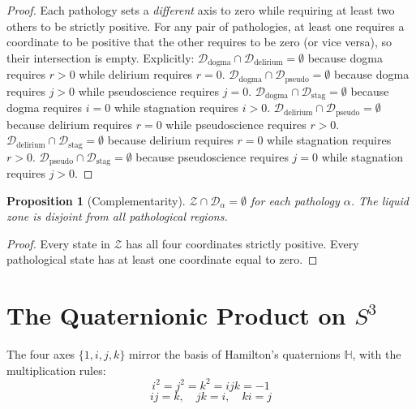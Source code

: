 \documentclass[11pt,a4paper]{article}
\newtheorem{proposition}[theorem]{Proposition}
\newcommand{\imag}[1]{{\color{icolor}#1}}
\newcommand{\exac}[1]{{\color{jcolor}#1}}
\newcommand{\recu}[1]{{\color{kcolor}#1}}
\newcommand{\LZ}{\mathcal{Z}}
\def\imag#1{#1}%
\def\exac#1{#1}%
\def\recu#1{#1}%
\begin{document}
\begin{proof}
Each pathology sets a \emph{different} axis to zero while requiring at
least two others to be strictly positive. For any pair of pathologies,
at least one requires a coordinate to be positive that the other
requires to be zero (or vice versa), so their intersection is empty.
Explicitly:
$\mathcal{D}_{\text{dogma}} \cap \mathcal{D}_{\text{delirium}} =
\emptyset$ because dogma requires $r > 0$ while delirium requires
$r = 0$.
$\mathcal{D}_{\text{dogma}} \cap \mathcal{D}_{\text{pseudo}} =
\emptyset$ because dogma requires $j > 0$ while pseudoscience requires
$j = 0$.
$\mathcal{D}_{\text{dogma}} \cap \mathcal{D}_{\text{stag}} =
\emptyset$ because dogma requires $i = 0$ while stagnation requires
$i > 0$.
$\mathcal{D}_{\text{delirium}} \cap \mathcal{D}_{\text{pseudo}} =
\emptyset$ because delirium requires $r = 0$ while pseudoscience
requires $r > 0$.
$\mathcal{D}_{\text{delirium}} \cap \mathcal{D}_{\text{stag}} =
\emptyset$ because delirium requires $r = 0$ while stagnation requires
$r > 0$.
$\mathcal{D}_{\text{pseudo}} \cap \mathcal{D}_{\text{stag}} =
\emptyset$ because pseudoscience requires $j = 0$ while stagnation
requires $j > 0$.
\end{proof}

\begin{proposition}[Complementarity]
\label{prop:complement}
$\LZ \cap \mathcal{D}_{\alpha} = \emptyset$ for each pathology
$\alpha$. The liquid zone is disjoint from all pathological regions.
\end{proposition}

\begin{proof}
Every state in $\LZ$ has all four coordinates strictly positive. Every
pathological state has at least one coordinate equal to zero.
\end{proof}

\section{The Quaternionic Product on \texorpdfstring{$S^3$}{S3}}
\label{sec:quaternion}

The four axes $\{1, \imag{i}, \exac{j}, \recu{k}\}$ mirror the basis of
Hamilton's quaternions $\mathbb{H}$, with the multiplication rules:
\begin{equation}
\imag{i}^2 = \exac{j}^2 = \recu{k}^2 = \imag{i}\exac{j}\recu{k} = -1
\end{equation}
\begin{equation}
\imag{i}\exac{j} = \recu{k}, \quad
\exac{j}\recu{k} = \imag{i}, \quad
\recu{k}\imag{i} = \exac{j}
\end{equation}
\end{document}
